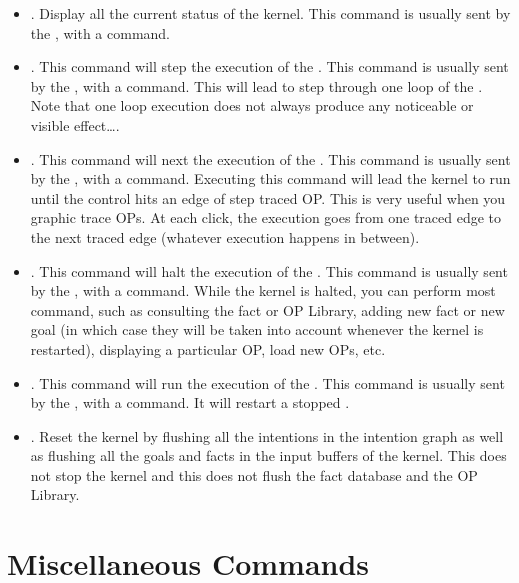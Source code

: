 \begin{itemize}

\item {}. Display all the current status of the
kernel. This command is usually sent by the \OPRSS{}, with a 
command. 

\item {}. This command will step the execution of the \CPK{}. This
command is usually sent by the \OPRSS{}, with a  command.  This
will lead to step through one loop of the \CPK{}. Note that one loop
execution does not always produce any noticeable or visible effect\dots{}.

\item {}. This command will next the execution of the \CPK{}. This
command is usually sent by the \OPRSS{}, with a  command.
Executing this command will lead the kernel to run until the control hits an
edge of step traced OP. This is very useful when you graphic trace OPs.  At
each click, the execution goes from one traced edge to the next traced edge
(whatever execution happens in between).


\item {}. This command will halt the execution of the \CPK{}. This
command is usually sent by the \OPRSS{}, with a  command. While
the kernel is halted, you can perform most command, such as consulting the fact
or OP Library, adding new fact or new goal (in which case they will be taken
into account whenever the kernel is restarted), displaying a particular OP,
load new OPs, etc.

\item {}. This command will run the execution of the \CPK{}. This
command is usually sent by the \OPRSS{}, with a  command.
It will restart a stopped \CPK{}.

\item {}. Reset the kernel by flushing all the
intentions in the intention graph as well as flushing all the goals and facts
in the input buffers of the kernel. This does not stop the kernel and this does
not flush the fact database and the OP Library.

\end{itemize}

\section{\CPK{} Miscellaneous Commands}


